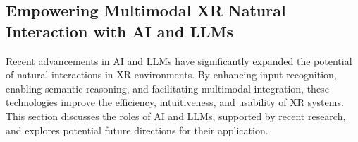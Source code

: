 \documentclass[review]{fcs}
\newcommand{\revise}[2]{\textcolor[rgb]{0,0,0}{#2}}
\newcommand{\ccite}{\textcolor[rgb]{0,0,1}{[cite]}}
\begin{document}








\subsection{\revise{}{Empowering Multimodal XR Natural Interaction with AI and LLMs}}  
\label{4.3}  

\revise{}{Recent advancements in AI and LLMs have significantly expanded the potential of natural interactions in XR environments. By enhancing input recognition, enabling semantic reasoning, and facilitating multimodal integration, these technologies improve the efficiency, intuitiveness, and usability of XR systems. This section discusses the roles of AI and LLMs, supported by recent research, and explores potential future directions for their application.}
\end{document}
